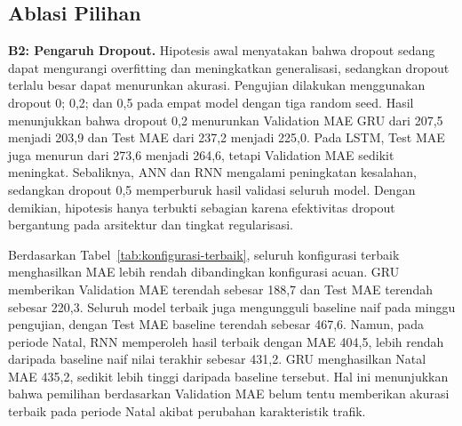 \documentclass[conference,a4paper]{IEEEtran}
\begin{document}
\subsection{Ablasi Pilihan}
\noindent\textbf{B2: Pengaruh Dropout.} Hipotesis awal menyatakan bahwa dropout sedang dapat mengurangi overfitting dan meningkatkan generalisasi, sedangkan dropout terlalu besar dapat menurunkan akurasi. Pengujian dilakukan menggunakan dropout 0; 0,2; dan 0,5 pada empat model dengan tiga random seed. Hasil menunjukkan bahwa dropout 0,2 menurunkan Validation MAE GRU dari 207,5 menjadi 203,9 dan Test MAE dari 237,2 menjadi 225,0. Pada LSTM, Test MAE juga menurun dari 273,6 menjadi 264,6, tetapi Validation MAE sedikit meningkat. Sebaliknya, ANN dan RNN mengalami peningkatan kesalahan, sedangkan dropout 0,5 memperburuk hasil validasi seluruh model. Dengan demikian, hipotesis hanya terbukti sebagian karena efektivitas dropout bergantung pada arsitektur dan tingkat regularisasi.

\begin{table}[t]
\centering
\caption{Perbandingan MAE konfigurasi acuan, terbaik, dan baseline naif}
\label{tab:konfigurasi-terbaik}
\end{table}

Berdasarkan Tabel~\ref{tab:konfigurasi-terbaik}, seluruh konfigurasi terbaik menghasilkan MAE lebih rendah dibandingkan konfigurasi acuan. GRU memberikan Validation MAE terendah sebesar 188,7 dan Test MAE terendah sebesar 220,3. Seluruh model terbaik juga mengungguli baseline naif pada minggu pengujian, dengan Test MAE baseline terendah sebesar 467,6. Namun, pada periode Natal, RNN memperoleh hasil terbaik dengan MAE 404,5, lebih rendah daripada baseline naif nilai terakhir sebesar 431,2. GRU menghasilkan Natal MAE 435,2, sedikit lebih tinggi daripada baseline tersebut. Hal ini menunjukkan bahwa pemilihan berdasarkan Validation MAE belum tentu memberikan akurasi terbaik pada periode Natal akibat perubahan karakteristik trafik.
\end{document}
